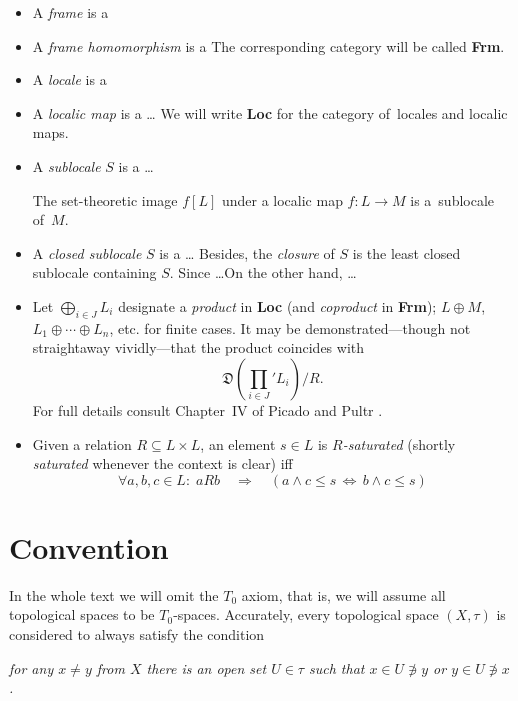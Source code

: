 \begin{itemize}
\item A \emph{frame} is a
\item A \emph{frame homomorphism} is a
The corresponding category will be called {\bf Frm}.
\item A \emph{locale} is a
\item A \emph{localic map} is a \ldots
We will write {\bf Loc} for the category of~locales and localic maps.
\item A \emph{sublocale} $S$ is a \ldots
  \begin{fact}
    The set-theoretic image $f[L]$ under a localic map $f\colon L\to M$
    is a~sublocale of~$M$.
  \end{fact}
\item A \emph{closed sublocale} $S$ is a \ldots
Besides, the \emph{closure} of $S$ is the least closed sublocale containing $S$.
Since \ldots On the other hand, \ldots
\item Let $\bigoplus_{i\in J} L_i$ designate a \emph{product} in {\bf Loc} (and
\emph{coproduct} in {\bf Frm}); $L \oplus M$, $L_1 \oplus\cdots\oplus L_n$, etc.
for finite cases.
It may be demonstrated---though not straightaway vividly---that the product
coincides with
\[
  \textstyle\mathfrak{D}\left(\prod_{i\in J}\nolimits' L_{i}\right)/R.
\]
For full details consult Chapter~IV of Picado and Pultr \cite{picado-pultr12}.
\item Given a relation $R\subseteq L \times L$, an element $s\in L$ is
\emph{$R$-saturated} (shortly \emph{saturated} whenever the context is clear)
  iff
\[
  \forall a, b, c\in L: \; aRb \quad \Rightarrow \quad \left( a \wedge c \leq s
  \, \Leftrightarrow \, b \wedge c \leq s \right)
\]
\end{itemize}

\section*{Convention}

In the whole text we will omit the $T_0$ axiom, that is, we will assume all
topological spaces to be $T_0$-spaces.
Accurately, every topological space $(X, \tau)$ is considered to always satisfy
the condition
\begin{center} \it
  for any $x \ne y$ from $X$ there is an open set $U \in \tau$ such that $x \in U
  \not\owns y$ or $y \in U \not\owns x$.
\end{center}
